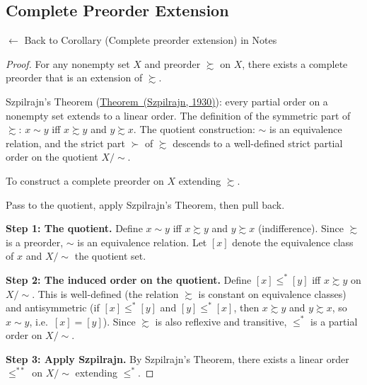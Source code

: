 
\subsection*{Complete Preorder Extension}
\label{prf:complete-preorder-extension}

\begin{remark*}[Return]
$\leftarrow$ Back to Corollary (Complete preorder extension) in Notes
\end{remark*}

\begin{proof}
\Claim For any nonempty set $X$ and preorder $\succsim$ on $X$, there exists a complete preorder that is an extension of $\succsim$.

\Given Szpilrajn's Theorem (\hyperref[thm:szpilrajn]{Theorem~(Szpilrajn,
1930)}): every partial order on a nonempty set extends to a linear order.
The definition of the symmetric part of $\succsim$: $x \sim y$ iff $x
\succsim y$ and $y \succsim x$. The quotient construction: $\sim$ is an
equivalence relation, and the strict part $\succ$ of $\succsim$ descends to a
well-defined strict partial order on the quotient $X/{\sim}$.

\Goal To construct a complete preorder on $X$ extending $\succsim$.

\Strategy Pass to the quotient, apply Szpilrajn's Theorem, then pull back.

\medskip
\noindent\textbf{Step 1: The quotient.} Define $x \sim y$ iff $x \succsim y$
and $y \succsim x$ (indifference). Since $\succsim$ is a preorder, $\sim$ is
an equivalence relation. Let $[x]$ denote the equivalence class of $x$ and
$X/{\sim}$ the quotient set.

\medskip
\noindent\textbf{Step 2: The induced order on the quotient.} Define $[x]
\leq^* [y]$ iff $x \succsim y$ on $X/{\sim}$. This is well-defined (the
relation $\succsim$ is constant on equivalence classes) and antisymmetric
(if $[x] \leq^* [y]$ and $[y] \leq^* [x]$, then $x \succsim y$ and $y
\succsim x$, so $x \sim y$, i.e.\ $[x] = [y]$). Since $\succsim$ is also
reflexive and transitive, $\leq^*$ is a partial order on $X/{\sim}$.

\medskip
\noindent\textbf{Step 3: Apply Szpilrajn.} By Szpilrajn's Theorem, there
exists a linear order $\leq^{**}$ on $X/{\sim}$ extending $\leq^*$.


\end{proof}
